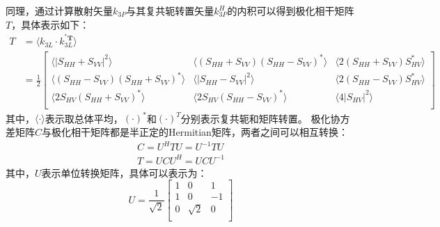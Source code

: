 \documentclass[promaster]{thesis-uestc}
\begin{document}
同理，通过计算散射矢量$k_{3P}$与其复共轭转置矢量$k_{3P}^{H}$的内积可以得到极化相干矩阵$T$，具体表示如下：
\begin{equation}
    \begin{aligned}
        T & =\left. \langle k_{3L}\cdot k_{3L}^{^*\boldsymbol{T}} \right. \rangle                                                                                                                                                                                                                  \\
          & =\frac{1}{2}\left[ \begin{matrix}
                                       \langle \left| S_{HH}+S_{VV} \right|^2\rangle                                               & \left. \langle \left( S_{HH}+S_{VV} \right) \left( S_{HH}-S_{VV} \right) ^* \right. \rangle & \left. \langle 2\left( S_{HH}+S_{VV} \right) S_{HV}^{*} \right. \rangle \\
                                       \left. \langle \left( S_{HH}-S_{VV} \right) \left( S_{HH}+S_{VV} \right) ^* \right. \rangle & \left. \langle \left| S_{HH}-S_{VV} \right|^2 \right. \rangle                               & \left. \langle 2\left( S_{HH}-S_{VV} \right) S_{HV}^{*} \right. \rangle \\
                                       \left. \langle 2S_{HV}\left( S_{HH}+S_{VV} \right) ^* \right. \rangle                       & \left. \langle 2S_{HV}\left( S_{HH}-S_{VV} \right) ^* \right. \rangle                       & \left. \langle 4\left| S_{HV} \right|^2 \right. \rangle                 \\
                                   \end{matrix} \right]
    \end{aligned}
\end{equation}
其中，$\langle \cdot \rangle$表示取总体平均，$(\cdot)^*$和$(\cdot)^T$分别表示复共轭和矩阵转置。
极化协方差矩阵$C$与极化相干矩阵都是半正定的Hermitian矩阵，两者之间可以相互转换：
\begin{gather}
    C=U^H T U=U^{-1} T U \\
    T=U C U^H=U C U^{-1}
\end{gather}
其中，$U$表示单位转换矩阵，具体可以表示为：
\begin{equation}
    U=\frac{1}{\sqrt{2}}\left[ \begin{matrix}
            1 & 0        & 1  \\
            1 & 0        & -1 \\
            0 & \sqrt{2} & 0  \\
        \end{matrix} \right]
\end{equation}
\end{document}
